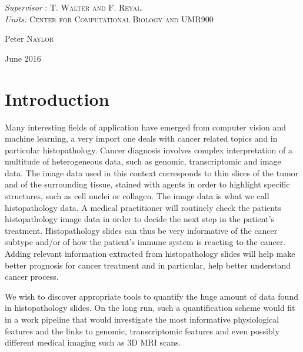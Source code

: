 \documentclass[a4paper,10pt]{article}
\begin{document}
\begin{titlepage}
   \begin{center}  \large
\textit{Supervisor} : \textsc{T. Walter and F. Reyal}. \\
\textit{Units:} \textsc{Center for Computational Biology and UMR900}

   \end{center}
     
  \begin{center} \Large
  Peter \textsc{Naylor}
  \end{center}


  \begin{center}  \large
    June 2016
  \end{center}

\end{titlepage}




\newpage
\tableofcontents
\newpage

\section{Introduction}

Many interesting fields of application have emerged from computer vision and machine learning, a very import one deals with cancer related topics and in particular histopathology. Cancer diagnosis involves complex interpretation of a multitude of heterogeneous data, such as genomic, transcriptomic and image data. The image data used in this context corresponds to thin slices of the tumor and of the surrounding tissue, stained with agents in order to highlight specific structures, such as cell nuclei or collagen. The image data is what we call histopathology data.
A medical practitioner will routinely check the patients histopathology image data in order to decide the next step in the patient's treatment. Histopathology slides can thus be very informative of the cancer subtype and/or of how the patient's immune system is reacting to the cancer. Adding relevant information extracted from histopathology slides will help make better prognosis for cancer treatment and in particular, help better understand cancer process. 

 We wish to discover appropriate tools to quantify the huge amount of data found in histopathology slides. On the long run, such a quantification scheme would fit in a work pipeline that would investigate the most informative physiological features and the links to genomic, transcriptomic features and even possibly different medical imaging such as 3D MRI scans.
 
\end{document}

